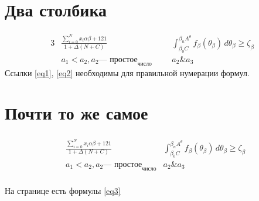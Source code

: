 \documentclass[a4paper, 12pt]{article}
\begin{document}
\section{Два столбика}
\begin{alignat}{3}
   & \frac{ \sum_{i=0}^{N}x_i\alpha\beta + 121}{1 + \Delta(N+C)} &  &  & \int_{\beta_0C}^{\beta_nA^\theta} f_\beta\left(\theta_\beta\right) \,d\theta_\beta \geqslant \zeta_\beta \label{eq1} \\
   & a_1 < a_2, a_2 \text{--- простое}_\text{число}              &  &  & a_2\& a_3 \label{eq2}
\end{alignat}
Ссылки \eqref{eq1}, \eqref{eq2} необходимы для правильной нумерации формул.
\section{Почти то же самое}
\begin{equation} \label{eq3}
  \begin{aligned}
    \begin{aligned}
       & \frac{ \sum_{i=0}^{N}x_i\alpha\beta + 121}{1 + \Delta(N+C)} & \int_{\beta_0C}^{\beta_nA^\theta} f_\beta\left(\theta_\beta\right) \,d\theta_\beta \geqslant \zeta_\beta \\
       & a_1 < a_2, a_2 \text{--- простое}_\text{число}              & a_2\& a_3
    \end{aligned}
  \end{aligned}
\end{equation} \\
На странице \pageref{eq3} есть формулы \eqref{eq3}
\end{document}
